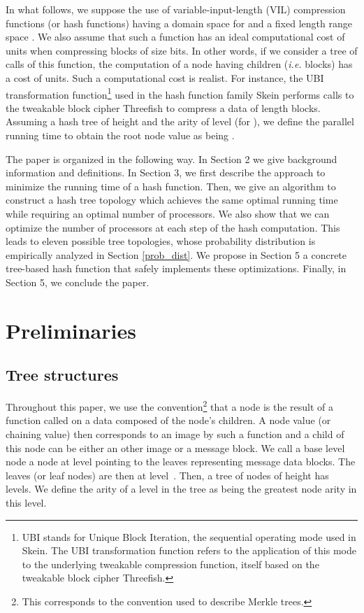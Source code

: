 \documentclass{llncs}
\begin{document}
In what follows, we suppose the use of variable-input-length (VIL) compression functions (or hash functions)
having a domain space   for  and a fixed length range space .
We also assume that such a function has an ideal computational cost of  units when compressing  blocks of size  bits.
In other words, if we consider a tree of calls of
this function, the computation of a node having  children (\emph{i.e.}  blocks) has a cost of  units.
Such a computational cost is realist. For instance, the UBI transformation function\footnote{UBI stands for Unique Block Iteration, the 
sequential operating mode used in Skein. The UBI transformation function refers to the application of this mode to the underlying tweakable
compression function, itself based on the tweakable block cipher Threefish.
}
used in the hash function family Skein \cite{FLSWBKCW09} performs  calls to the tweakable block cipher Threefish
to compress a data of length  blocks. Assuming a hash tree of height  and  the arity of level  (for ), we define the parallel 
running time to obtain the root node value as being .

The paper is organized in the following way. In Section 2 we give background information and definitions.
In Section 3, we first describe the approach to minimize the running time of a hash function. Then, we give an algorithm to
construct a hash tree topology which achieves the same optimal running time while requiring an optimal number of processors.
We also show that we can optimize the number of processors at each step of the hash computation. This leads to eleven possible
tree topologies, whose probability distribution is empirically analyzed in Section \ref{prob_dist}.
We propose in Section 5
a concrete tree-based hash function that safely implements these optimizations.
Finally, in Section 5,  we conclude the paper. 

\section{Preliminaries}\label{subsec:backg}

\subsection{Tree structures}


Throughout this paper, 
we use the 
convention\footnote{This corresponds to the convention used to describe Merkle trees. 
} that a node is the result of
a function called on a data composed of the node's children.
A node value (or chaining value) then corresponds to an image by such a function and a child of this node can be either
an other image or a message block.
We call a base level node a node at level  pointing to the leaves representing message data blocks. The leaves (or leaf nodes) 
are then at level~. Then, a tree of nodes of height  has  levels.
We define the arity of a level in the tree as being the greatest node arity in this level.
\end{document}

